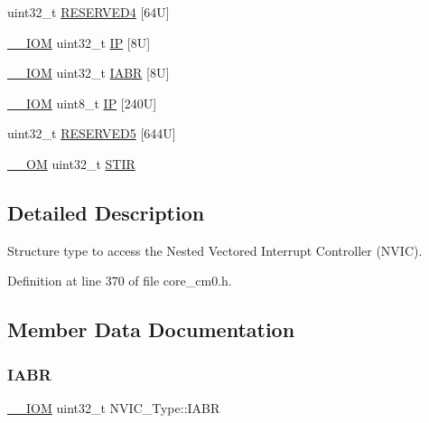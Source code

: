 \begin{DoxyCompactItemize}
uint32\+\_\+t \hyperlink{struct_n_v_i_c___type_af88b33dd5c8644293a71905a6d22f2f2}{R\+E\+S\+E\+R\+V\+E\+D4} \mbox{[}64\+U\mbox{]}
\item 
\hyperlink{core__sc300_8h_ab6caba5853a60a17e8e04499b52bf691}{\+\_\+\+\_\+\+I\+OM} uint32\+\_\+t \hyperlink{struct_n_v_i_c___type_a4eef47929a0d1317a107f1ac62e28464}{IP} \mbox{[}8\+U\mbox{]}
\item 
\hyperlink{core__sc300_8h_ab6caba5853a60a17e8e04499b52bf691}{\+\_\+\+\_\+\+I\+OM} uint32\+\_\+t \hyperlink{struct_n_v_i_c___type_ac803b714c8dd99a308ce9a0a2c611c56}{I\+A\+BR} \mbox{[}8\+U\mbox{]}
\item 
\hyperlink{core__sc300_8h_ab6caba5853a60a17e8e04499b52bf691}{\+\_\+\+\_\+\+I\+OM} uint8\+\_\+t \hyperlink{struct_n_v_i_c___type_a9a4341692e45d089a113986a3d344e98}{IP} \mbox{[}240\+U\mbox{]}
\item 
uint32\+\_\+t \hyperlink{struct_n_v_i_c___type_a22dc0f9f456717bd26de5a6451547be3}{R\+E\+S\+E\+R\+V\+E\+D5} \mbox{[}644\+U\mbox{]}
\item 
\hyperlink{core__sc300_8h_a0ea2009ed8fd9ef35b48708280fdb758}{\+\_\+\+\_\+\+OM} uint32\+\_\+t \hyperlink{struct_n_v_i_c___type_a37de89637466e007171c6b135299bc75}{S\+T\+IR}
\end{DoxyCompactItemize}


\subsection{Detailed Description}
Structure type to access the Nested Vectored Interrupt Controller (N\+V\+IC). 

Definition at line 370 of file core\+\_\+cm0.\+h.



\subsection{Member Data Documentation}
\mbox{\label{struct_n_v_i_c___type_ac803b714c8dd99a308ce9a0a2c611c56}} 
\subsubsection{\texorpdfstring{I\+A\+BR}{IABR}}
{\footnotesize\ttfamily \hyperlink{core__sc300_8h_ab6caba5853a60a17e8e04499b52bf691}{\+\_\+\+\_\+\+I\+OM} uint32\+\_\+t N\+V\+I\+C\+\_\+\+Type\+::\+I\+A\+BR}

